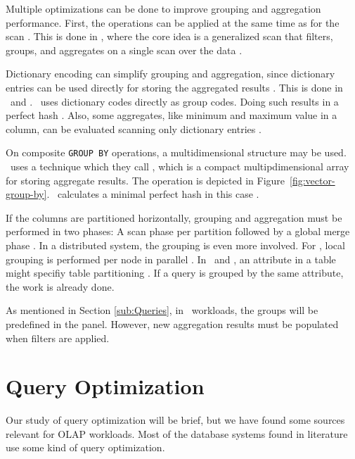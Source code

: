 Multiple optimizations can be done to improve grouping and aggregation performance. First, the operations can be applied at the same time as for the scan \cite{Lemke2010-is}. This is done in \blink, where the core idea is a generalized scan that filters, groups, and aggregates on a single scan over the data \cite{Raman2008-gi}.

Dictionary encoding can simplify grouping and aggregation, since dictionary entries can be used directly for storing the aggregated results \cite{Boncz2005-wj, Lemke2010-is}. This is done in \monetx~and \blink. \blink~uses dictionary codes directly as group codes. Doing such results in a perfect hash \cite{Raman2008-gi}. Also, some aggregates, like minimum and maximum value in a column, can be evaluated scanning only  dictionary entries \cite{Lemke2010-is}.

On composite \texttt{GROUP BY} operations, a multidimensional structure may be used. \oracle~uses a technique which they call , which is a compact multipdimensional array for storing aggregate results. The operation is depicted in Figure~\ref{fig:vector-group-by}. \blink~calculates a minimal perfect hash in this case \cite{Raman2008-gi}.

If the columns are partitioned horizontally, grouping and aggregation must be performed in two phases: A scan phase per partition followed by a global merge phase \cite{Lemke2010-is}. In a distributed system, the grouping is even more involved. For \ibm, local grouping is performed per node in parallel \cite{Raman2013-em}. In \exasol~and \oracle, an attribute in a table might specifiy table partitioning \cite{Exasol2014-xh, Lahiri2015-mz}. If a query is grouped by the same attribute, the work is already done.

As mentioned in Section \ref{sub:Queries}, in \bd~workloads, the groups will be predefined in the panel. However, new aggregation results must be populated when filters are applied.

\section{Query Optimization}
\label{sec:Query Optimization}
Our study of query optimization will be brief, but we have found some sources relevant for OLAP workloads. Most of the database systems found in literature use some kind of query optimization. 

